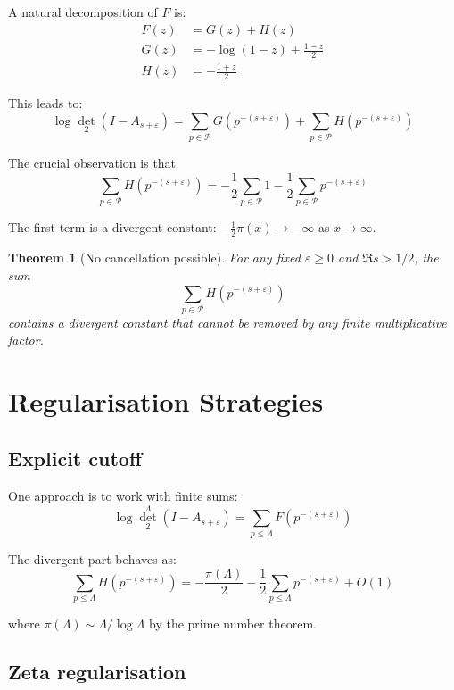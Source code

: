 \documentclass[11pt,a4paper]{article}
\newtheorem{theorem}{Theorem}[section]
\theoremstyle{definition}
\theoremstyle{remark}
\newcommand{\calP}{\mathcal{P}}
\begin{document}
A natural decomposition of $F$ is:
\begin{align}
F(z) &= G(z) + H(z)\\
G(z) &= -\log(1-z) + \frac{1-z}{2}\\
H(z) &= -\frac{1+z}{2}
\end{align}

This leads to:
\[
\log \det_2(I - A_{s+\varepsilon}) = \sum_{p \in \calP} G(p^{-(s+\varepsilon)}) + \sum_{p \in \calP} H(p^{-(s+\varepsilon)})
\]

The crucial observation is that
\[
\sum_{p \in \calP} H(p^{-(s+\varepsilon)}) = -\frac{1}{2}\sum_{p \in \calP} 1 - \frac{1}{2}\sum_{p \in \calP} p^{-(s+\varepsilon)}
\]

The first term is a divergent constant: $-\frac{1}{2}\pi(x) \to -\infty$ as $x \to \infty$.

\begin{theorem}[No cancellation possible]\label{thm:no-cancel}
For any fixed $\varepsilon \geq 0$ and $\Re s > 1/2$, the sum
\[
\sum_{p \in \calP} H(p^{-(s+\varepsilon)})
\]
contains a divergent constant that cannot be removed by any finite multiplicative factor.
\end{theorem}

\section{Regularisation Strategies}\label{sec:regularisation}

\subsection{Explicit cutoff}

One approach is to work with finite sums:
\[
\log \det_2^\Lambda(I - A_{s+\varepsilon}) = \sum_{p \leq \Lambda} F(p^{-(s+\varepsilon)})
\]

The divergent part behaves as:
\[
\sum_{p \leq \Lambda} H(p^{-(s+\varepsilon)}) = -\frac{\pi(\Lambda)}{2} - \frac{1}{2}\sum_{p \leq \Lambda} p^{-(s+\varepsilon)} + O(1)
\]

where $\pi(\Lambda) \sim \Lambda/\log \Lambda$ by the prime number theorem.

\subsection{Zeta regularisation}
\end{document}
